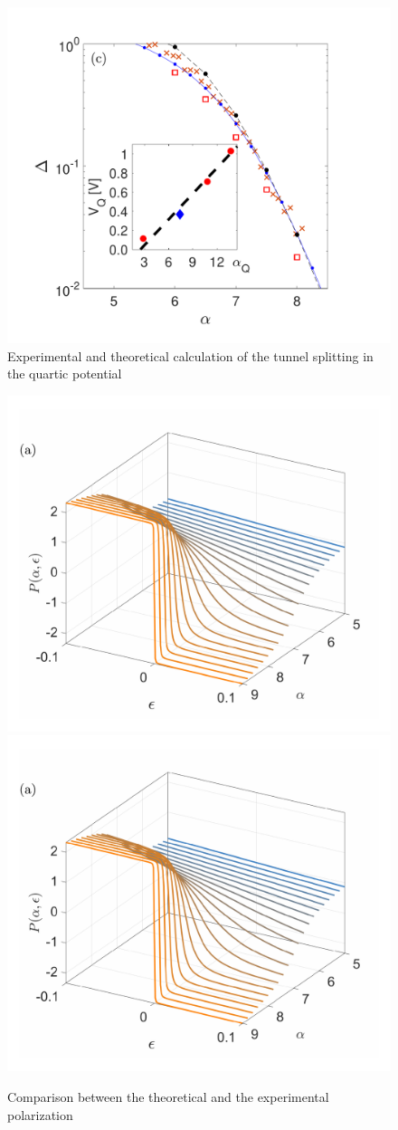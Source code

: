 \documentclass[prl,twocolumn,showpacs,preprintnumbers,amsmath,amssymb, superscriptaddress]{revtex4-2}
\newcommand{\1}{{1\hspace*{-0.5ex} \textrm{l} \hspace*{0.5ex}}}
\begin{document}
	\begin{figure}[tbh!]
		\begin{center}
		 	\includegraphics[width=0.9\columnwidth]{Fig_spectral_gap_comparison.pdf}
		 	\caption{Experimental and theoretical calculation of the tunnel splitting in the quartic potential}
		 	\label{fig:gap}
		\end{center}
	\end{figure}
	  
		


	\begin{figure}[tbh!]
		\begin{center}
			\includegraphics[width=0.49\columnwidth]{fig_Polarization_3D_theor.pdf}
			\includegraphics[width=0.49\columnwidth]{fig_Polarization_3D_theor.pdf}
			\caption{Comparison between the theoretical and the experimental polarization}
			\label{fig:gap}
		\end{center}
	\end{figure}
  
\end{document}
